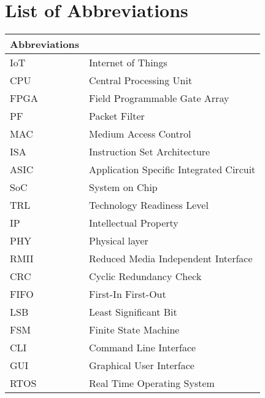


\clearpage
\pagestyle{headings}

\chapter[List of Abbreviations ]{List of Abbreviations}


\begin{center}
	\small
	\begin{longtable}{ll}
	\toprule
	Abbreviations & {} \\
	\bottomrule
	
	IoT				& Internet of Things \\
	CPU				& Central Processing Unit \\
	FPGA				& Field Programmable Gate Array \\
	PF				& Packet Filter \\
	MAC				& Medium Access Control \\
	ISA				& Instruction Set Architecture \\
	ASIC				& Application Specific Integrated Circuit \\
	SoC				& System on Chip \\
	TRL				& Technology Readiness Level \\
	IP				& Intellectual Property \\
	PHY				& Physical layer \\
	RMII			& Reduced Media Independent Interface \\
	CRC			& Cyclic Redundancy Check \\
	FIFO			& First-In First-Out \\
	LSB				& Least Significant Bit \\
	FSM				& Finite State Machine \\
	CLI				& Command Line Interface \\
	GUI				& Graphical User Interface \\
	RTOS			& Real Time Operating System \\
	\hline 
	\end{longtable}
\end{center}

\clearpage

\tableofcontents
	\clearpage
\listoffigures
\listoftables


